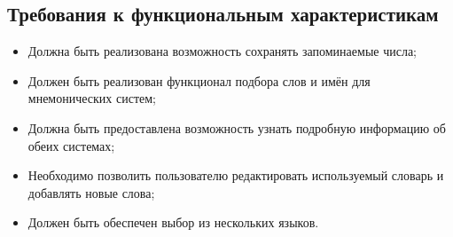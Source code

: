 \documentclass[draft]{article}
\begin{document}
\subsection{Требования к функциональным характеристикам}
\begin{itemize}
\item Должна быть реализована возможность сохранять запоминаемые числа;
\item Должен быть реализован функционал подбора слов и имён для мнемонических систем;
\item Должна быть предоставлена возможность узнать подробную информацию об обеих системах;
\item Необходимо позволить пользователю редактировать используемый словарь и добавлять новые слова;
\item Должен быть обеспечен выбор из нескольких языков.
\end{itemize}
\end{document}
